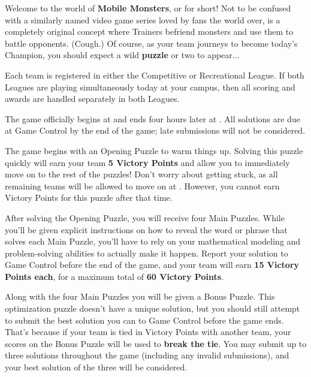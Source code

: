 
Welcome to the world of \textbf{Mobile Monsters}, or \mappMobimon{} for short!
Not to be confused with a similarly named video game series loved
by fans the world over, \mappMobimon{} is a completely original concept
where Trainers befriend monsters and use them to battle opponents.
(Cough.) Of course,
as your team journeys to become today's \mappMobimon{} Champion,
you should expect a wild \textbf{puzzle} or two to appear...


Each team is registered in either the Competitive or Recreational League.
If both Leagues are playing simultaneously today at your campus, then all
scoring and awards are handled separately in both Leagues.


The game officially begins at \underline{\hspace{5em}} and ends
four hours later at \underline{\hspace{5em}}. All solutions are due at
Game Control by the end of the game; late submissions will not be considered.


The game begins with an Opening Puzzle to warm things up. Solving this
puzzle quickly will earn your team \textbf{5 Victory Points} and allow
you to immediately move on to the rest of the puzzles!
Don't worry about getting stuck, as all remaining
teams will be allowed to move on
at \underline{\hspace{5em}}. However, you cannot earn Victory Points for
this puzzle after that time.


After solving the Opening Puzzle, you will receive four
Main Puzzles. While you'll be given explicit instructions on how to
reveal the word or phrase that solves each Main Puzzle, you'll have to
rely on your mathematical modeling and problem-solving abilities to actually
make it happen. Report your solution to Game Control before the end of
the game, and your team will earn \textbf{15 Victory Points each},
for a maximum total of \textbf{60 Victory Points}.

\newpage


Along with the four Main Puzzles you will be given a Bonus Puzzle. This
optimization puzzle doesn't have a unique solution, but you should still
attempt to submit the best solution you can to Game Control before the
game ends. That's because if your team is tied in
Victory Points with another team, your scores on the Bonus Puzzle will be used
to \textbf{break the tie}. You may submit up to three solutions throughout
the game (including any invalid submissions), and your best solution of the
three will be considered.

